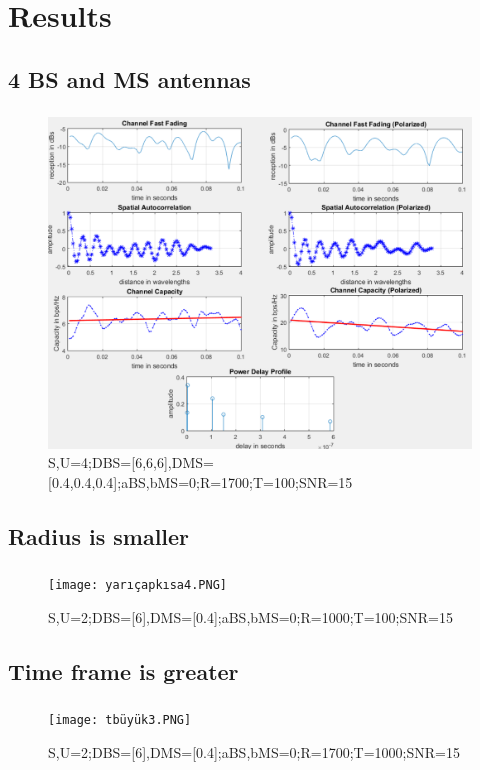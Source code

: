 \documentclass[10pt,aspectratio=169]{beamer}
\begin{document}
	\section{Results}
	\subsection{4 BS and MS antennas}
	\begin{frame}
		\frametitle{\insertsection}
		\framesubtitle{\insertsubsection}
		\begin{figure}[h!]
  \includegraphics[scale=0.30 ]{1.PNG}
  \caption{S,U=4;DBS=[6,6,6],DMS=[0.4,0.4,0.4];aBS,bMS=0;R=1700;T=100;SNR=15}
\end{figure}
\end{frame}
	\subsection{Radius is smaller}
	\begin{frame}
		\frametitle{\insertsection}
		\framesubtitle{\insertsubsection}	 
       \begin{figure}[h!]
  \texttt{[image: yarıçapkısa4.PNG]}
  \caption{S,U=2;DBS=[6],DMS=[0.4];aBS,bMS=0;R=1000;T=100;SNR=15}
\end{figure}

	\end{frame}
	\subsection{Time frame is greater}
	\begin{frame}
		\frametitle{\insertsection}
		\framesubtitle{\insertsubsection}	 
       \begin{figure}[h!]
  \texttt{[image: tbüyük3.PNG]}
  \caption{S,U=2;DBS=[6],DMS=[0.4];aBS,bMS=0;R=1700;T=1000;SNR=15}
\end{figure}

	\end{frame}
        
\end{document}
